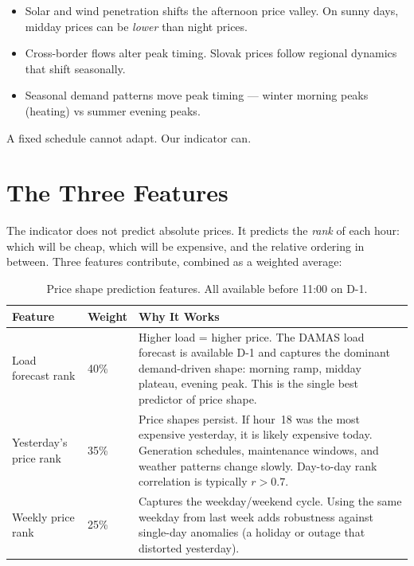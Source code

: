 \documentclass[11pt,a4paper]{article}
\begin{document}
\begin{itemize}[leftmargin=*]
\item Solar and wind penetration shifts the afternoon price valley. On sunny days, midday prices can be \emph{lower} than night prices.
\item Cross-border flows alter peak timing. Slovak prices follow regional dynamics that shift seasonally.
\item Seasonal demand patterns move peak timing --- winter morning peaks (heating) vs summer evening peaks.
\end{itemize}

A fixed schedule cannot adapt. Our indicator can.

\section{The Three Features}

The indicator does not predict absolute prices. It predicts the \emph{rank} of each hour: which will be cheap, which will be expensive, and the relative ordering in between. Three features contribute, combined as a weighted average:

\begin{table}[H]
\centering
\begin{tabular}{llp{7cm}}
\toprule
\textbf{Feature} & \textbf{Weight} & \textbf{Why It Works} \\
\midrule
Load forecast rank & 40\% & Higher load = higher price. The DAMAS load forecast is available D-1 and captures the dominant demand-driven shape: morning ramp, midday plateau, evening peak. This is the single best predictor of price shape. \\
Yesterday's price rank & 35\% & Price shapes persist. If hour~18 was the most expensive yesterday, it is likely expensive today. Generation schedules, maintenance windows, and weather patterns change slowly. Day-to-day rank correlation is typically $r > 0.7$. \\
Weekly price rank & 25\% & Captures the weekday/weekend cycle. Using the same weekday from last week adds robustness against single-day anomalies (a holiday or outage that distorted yesterday). \\
\bottomrule
\end{tabular}
\caption{Price shape prediction features. All available before 11:00 on D-1.}
\end{table}
\end{document}
